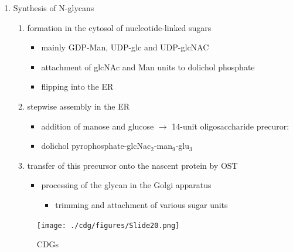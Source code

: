 \documentclass{scrartcl}
\begin{document}
\begin{enumerate}
\item Synthesis of N-glycans
\label{sec:orga42a59e}
\begin{enumerate}
\item formation in the cytosol of nucleotide-linked sugars
\begin{itemize}
\item mainly GDP-Man, UDP-glc and UDP-glcNAC
\item attachment of glcNAc and Man units to dolichol phosphate
\item flipping into the ER
\end{itemize}
\item stepwise assembly in the ER
\begin{itemize}
\item addition of manose and glucose \(\to\) 14-unit oligosaccharide precuror:
\item dolichol pyrophosphate-glcNac\(_{\text{2}}\)-man\(_{\text{9}}\)-glu\(_{\text{3}}\)
\end{itemize}
\item transfer of this precursor onto the nascent protein by OST
\begin{itemize}
\item processing of the glycan in the Golgi apparatus
\begin{itemize}
\item trimming and attachment of various sugar units
\end{itemize}
\end{itemize}
\end{enumerate}

\begin{figure}[htbp]
\centering
\texttt{[image: ./cdg/figures/Slide20.png]}
\caption{\label{fig:orgc357577}
CDGs}
\end{figure}


\end{enumerate}
\end{document}

